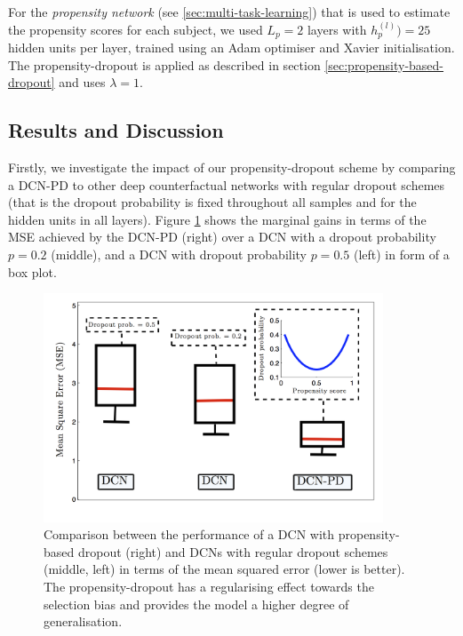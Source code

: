 For the \emph{propensity network} (see \ref{sec:multi-task-learning}) that is used to estimate the propensity scores for each subject, we used $L_p = 2$ layers with $h_p^{(l)}) = 25$ hidden units per layer, trained using an Adam optimiser %
and Xavier initialisation. %
The propensity-dropout is applied as described in section \ref{sec:propensity-based-dropout} and uses $\lambda = 1$. 

\subsection{Results and Discussion}
Firstly, we investigate the impact of our propensity-dropout scheme by comparing a DCN-PD to other deep counterfactual networks with regular dropout schemes (that is the dropout probability is fixed throughout all samples and for the hidden units in all layers). Figure \ref{fig:propensity-dropout-boxplot} shows the marginal gains in terms of the MSE achieved by the DCN-PD (right) over a DCN with a dropout probability $p=0.2$ (middle), and a DCN with dropout probability $p=0.5$ (left) in form of a box plot. 





\begin{figure}[h]
	\centering
	\includegraphics[width=0.9\textwidth]{figures/chapter-5/pd-boxplot.png}
	\caption{Comparison between the performance of a DCN with propensity-based dropout (right) and DCNs with regular dropout schemes (middle, left) in terms of the mean squared error (lower is better). The propensity-dropout has a regularising effect towards the selection bias and provides the model a higher degree of generalisation. }\label{fig:propensity-dropout-boxplot}
\end{figure}

